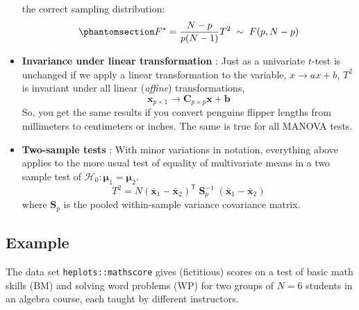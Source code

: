 \documentclass[
  letterpaper,
  10pt,
  krantz2]{krantz}
\makeatletter
\newenvironment{Shaded}{\begin{snugshade}}{\end{snugshade}}
\newcommand{\AttributeTok}[1]{\textcolor[rgb]{0.40,0.45,0.13}{#1}}
\newcommand{\CommentTok}[1]{\textcolor[rgb]{0.37,0.37,0.37}{#1}}
\newcommand{\FunctionTok}[1]{\textcolor[rgb]{0.28,0.35,0.67}{#1}}
\newcommand{\NormalTok}[1]{\textcolor[rgb]{0.00,0.23,0.31}{#1}}
\newcommand{\StringTok}[1]{\textcolor[rgb]{0.13,0.47,0.30}{#1}}
\newenvironment{kframe}{%
  \medskip{}
  \setlength{\fboxsep}{.8em}
  \def\at@end@of@kframe{}%
  \ifinner\ifhmode%
  \def\at@end@of@kframe{\end{minipage}}%
  \begin{minipage}{\columnwidth}%
  \fi\fi%
  \def\FrameCommand##1{\hskip\@totalleftmargin \hskip-\fboxsep
  \colorbox{shadecolor}{##1}\hskip-\fboxsep
      \hskip-\linewidth \hskip-\@totalleftmargin \hskip\columnwidth}%
  \MakeFramed {\advance\hsize-\width
    \@totalleftmargin\z@ \linewidth\hsize
    \@setminipage}}%
{\par\unskip\endMakeFramed%
  \at@end@of@kframe}
\renewenvironment{Shaded}{\begin{kframe}}{\end{kframe}}
\makeatother
\begin{document}
\begin{itemize}
  the correct sampling distribution:
  \begin{equation}\phantomsection\label{eq-Fstat}{
  F^* = \frac{N - p}{p (N-1)} T^2 \; \sim \; F (p, N - p)
  }\end{equation}
\item
  \textbf{Invariance under linear transformation} : Just as a univariate
  \(t\)-test is unchanged if we apply a linear transformation to the
  variable, \(x \rightarrow a x + b\), \(T^2\) is invariant under all
  linear (\emph{affine}) transformations, \[
  \mathbf{x}_{p \times 1} \rightarrow \mathbf{C}_{p \times p} \mathbf{x} + \mathbf{b}
  \] So, you get the same results if you convert penguins flipper
  lengths from millimeters to centimeters or inches. The same is true
  for all MANOVA tests.
\item
  \textbf{Two-sample tests} : With minor variations in notation,
  everything above applies to the more usual test of equality of
  multivariate means in a two sample test of
  \(\mathcal{H}_0 : \mathbf{\mu}_1 = \mathbf{\mu}_2\). \[
  T^2 = N (\bar{\mathbf{x}}_1 - \bar{\mathbf{x}}_2)^\mathsf{T} \; \mathbf{S}_p^{-1} \; (\bar{\mathbf{x}}_1 - \bar{\mathbf{x}}_2)
  \] where \(\mathbf{S}_p\) is the pooled within-sample variance
  covariance matrix.
\end{itemize}

\subsection*{Example}\label{example-1}

The data set \texttt{heplots::mathscore} gives (fictitious) scores on a
test of basic math skills (BM) and solving word problems (WP) for two
groups of \(N=6\) students in an algebra course, each taught by
different instructors.

\begin{Shaded}
\end{Shaded}
\end{document}
